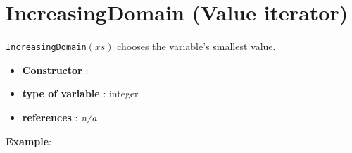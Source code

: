 \section{IncreasingDomain (Value iterator)}\label{increasingdomain:increasingdomainvaliterator}\hypertarget{increasingdomain:increasingdomainvaliterator}{}
\begin{notedef}
  \texttt{IncreasingDomain}$(xs)$ chooses the variable's smallest value.
\end{notedef}

\begin{itemize}
	\item \textbf{Constructor} : 
	\item \textbf{type of variable} : integer
	\item \textbf{references} : \emph{n/a}
\end{itemize}

\textbf{Example}:
%


